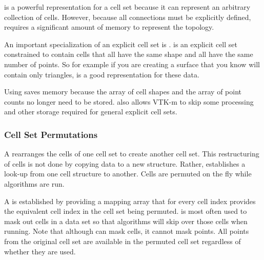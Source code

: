  is a powerful representation for a cell set
because it can represent an arbitrary collection of cells. However, because
all connections must be explicitly defined,
 requires a significant amount of memory to
represent the topology.


An important specialization of an explicit cell set is
.  is an
explicit cell set constrained to contain cells that all have the same shape
and all have the same number of points. So for example if you are creating
a surface that you know will contain only triangles,
 is a good representation for these data.

Using  saves memory because the array of
cell shapes and the array of point counts no longer need to be stored.
 also allows VTK-m to skip some
processing and other storage required for general explicit cell sets.



\subsubsection{Cell Set Permutations}


A  rearranges the cells of one cell set to
create another cell set. This restructuring of cells is not done by copying
data to a new structure. Rather, 
establishes a look-up from one cell structure to another. Cells are permuted
on the fly while algorithms are run.

A  is established by providing a mapping
array that for every cell index provides the equivalent cell index in the
cell set being permuted.  is most often
used to mask out cells in a data set so that algorithms will skip over
those cells when running. Note that although
 can mask cells, it cannot mask points.
All points from the original cell set are available in the permuted cell
set regardless of whether they are used.

